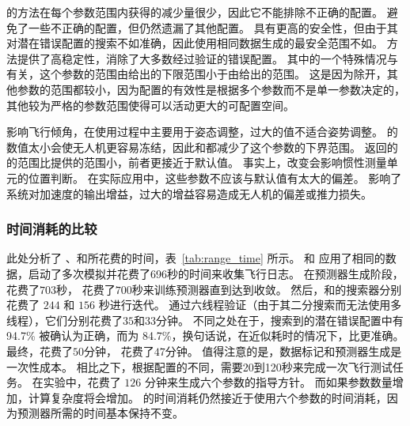 


的方法在每个参数范围内获得的减少量很少，因此它不能排除不正确的配置。
避免了一些不正确的配置，但仍然遗漏了其他配置。
具有更高的安全性，但由于其对潜在错误配置的搜索不如\icsearcher 准确，因此使用相同数据生成的最安全范围不如\icsearcher。
\icsearcher 方法提供了高稳定性，消除了大多数经过验证的错误配置。
其中的一个特殊情况与有关，这个参数的范围由\icsearcher 给出的下限范围小于由给出的范围。
这是因为除开，其他参数的范围都较小，因为配置的有效性是根据多个参数而不是单一参数决定的，其他较为严格的参数范围使得可以活动更大的可配置空间。

影响飞行倾角，在使用过程中主要用于姿态调整，过大的值不适合姿势调整。
的数值太小会使无人机更容易冻结，因此和\icsearcher 都减少了这个参数的下界范围。
\icsearcher 返回的 的范围比提供的范围小，前者更接近于默认值。
事实上，改变会影响惯性测量单元的位置判断。
在实际应用中，这些参数不应该与默认值有太大的偏差。
影响了系统对加速度的输出增益，过大的增益容易造成无人机的偏差或推力损失。
    
\subsubsection{时间消耗的比较}
此处分析了 \icsearcher、和所花费的时间，表~\ref{tab:range_time} 所示。
\icsearcher 和  应用了相同的数据，启动了多次模拟并花费了696秒的时间来收集飞行日志。
在预测器生成阶段，\icsearcher 花费了$703$秒， 花费了$700$秒来训练预测器直到达到收敛。
然后，\icsearcher 和的搜索器分别花费了 $244$ 和 $156$ 秒进行迭代。
通过六线程验证（由于其二分搜索而无法使用多线程），它们分别花费了$35$和$33$分钟。
不同之处在于，\icsearcher 搜索到的潜在错误配置中有 94.7\% 被确认为正确，而为 84.7\%，换句话说，在近似耗时的情况下，\icsearcher 比更准确。
最终，\icsearcher 花费了$50$分钟， 花费了$47$分钟。
值得注意的是，数据标记和预测器生成是一次性成本。
相比之下，根据配置的不同，需要20到120秒来完成一次飞行测试任务。
在实验中，花费了 $126$ 分钟来生成六个参数的指导方针。
而如果参数数量增加，计算复杂度将会增加。
\icsearcher 的时间消耗仍然接近于使用六个参数的时间消耗，因为预测器所需的时间基本保持不变。



